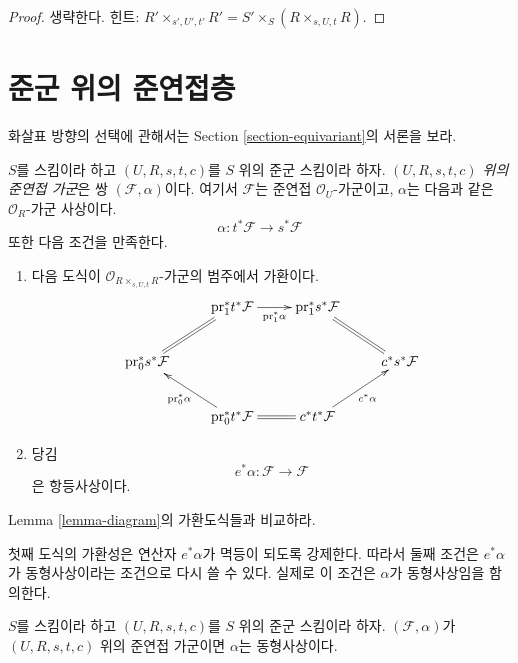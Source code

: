 \begin{proof}
생략한다. 힌트:
$R' \times_{s', U', t'} R' = S' \times_S (R \times_{s, U, t} R)$.
\end{proof}









\section{준군 위의 준연접층}
\label{section-groupoids-quasi-coherent}

\noindent
화살표 방향의 선택에 관해서는 Section \ref{section-equivariant}의 서론을 보라.

\begin{definition}
\label{definition-groupoid-module}
$S$를 스킴이라 하고 $(U, R, s, t, c)$를 $S$ 위의 준군 스킴이라 하자.
{\it $(U, R, s, t, c)$ 위의 준연접 가군}은 쌍 $(\mathcal{F}, \alpha)$이다. 여기서 $\mathcal{F}$는
준연접 $\mathcal{O}_U$-가군이고, $\alpha$는 다음과 같은 $\mathcal{O}_R$-가군 사상이다.
$$
\alpha : t^*\mathcal{F} \longrightarrow s^*\mathcal{F}
$$
또한 다음 조건을 만족한다.
\begin{enumerate}
\item 다음 도식이 $\mathcal{O}_{R \times_{s, U, t} R}$-가군의 범주에서 가환이다.
$$
\xymatrix{
& \text{pr}_1^*t^*\mathcal{F} \ar[r]_-{\text{pr}_1^*\alpha} &
\text{pr}_1^*s^*\mathcal{F} \ar@{=}[rd] & \\
\text{pr}_0^*s^*\mathcal{F} \ar@{=}[ru] & & & c^*s^*\mathcal{F} \\
& \text{pr}_0^*t^*\mathcal{F} \ar[lu]^{\text{pr}_0^*\alpha} \ar@{=}[r] &
c^*t^*\mathcal{F} \ar[ru]_{c^*\alpha}
}
$$
\item 당김
$$
e^*\alpha : \mathcal{F} \longrightarrow \mathcal{F}
$$
은 항등사상이다.
\end{enumerate}
Lemma \ref{lemma-diagram}의 가환도식들과 비교하라.
\end{definition}

\noindent
첫째 도식의 가환성은 연산자 $e^*\alpha$가 멱등이 되도록 강제한다. 따라서 둘째 조건은 $e^*\alpha$가
동형사상이라는 조건으로 다시 쓸 수 있다. 실제로 이 조건은 $\alpha$가 동형사상임을 함의한다.

\begin{lemma}
\label{lemma-isomorphism}
$S$를 스킴이라 하고 $(U, R, s, t, c)$를 $S$ 위의 준군 스킴이라 하자.
$(\mathcal{F}, \alpha)$가 $(U, R, s, t, c)$ 위의 준연접 가군이면 $\alpha$는 동형사상이다.
\end{lemma}

